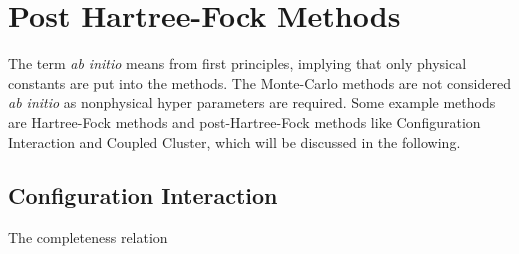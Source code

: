 \chapter{Post Hartree-Fock Methods}\label{chp:posthartreefock}
The term \textit{ab initio} means from first principles, implying that only physical constants are put into the methods. The Monte-Carlo methods are not considered \textit{ab initio} as nonphysical hyper parameters are required. Some example methods are Hartree-Fock methods and post-Hartree-Fock methods like Configuration Interaction and Coupled Cluster, which will be discussed in the following. 

\section{Configuration Interaction} \label{subsec:ci}
The completeness relation

